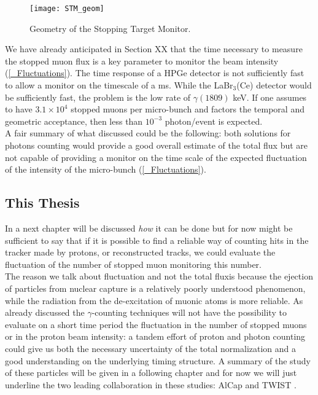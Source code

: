 \documentclass[12pt,a4paper,openright, oneside, titlepage]{book} %
\begin{document}
\begin{figure}[h!]
\centering
\texttt{[image: STM\_geom]}
\caption{Geometry of the Stopping Target Monitor.}
\label{_STM_geom}
\end{figure}

\noindent
We have already anticipated in Section XX that the time necessary to measure the stopped muon flux is a key parameter to monitor
the beam intensity (\ref{_Fluctuations}). 
The time response of a HPGe detector is not sufficiently fast to allow a monitor on the timescale of a ms.
While the LaBr$_3$(Ce) detector would be sufficiently fast, the problem is the low rate of $\gamma(1809)$ keV.
If one assumes to have $3.1\times10^4$ stopped muons per micro-bunch and factors 
the temporal and geometric acceptance, then less than $10^{-3}$ photon/event is expected.\\ 
A fair summary of what discussed could be the following: both solutions for photons counting would provide a good overall estimate of the total flux but are not capable of providing a monitor on the time scale of the expected fluctuation of the intensity of the micro-bunch (\ref{_Fluctuations}).

\subsection{This Thesis}
In a next chapter will be discussed \textit{how} it can be done but for now might be sufficient to say that if it is possible to find a reliable way of counting hits in the tracker made by protons, or reconstructed tracks, we could evaluate the fluctuation of the number of stopped muon monitoring this number.\\
The reason we talk about fluctuation and not the total fluxis because the ejection of particles from nuclear capture is a relatively poorly understood phenomenon, while the radiation from the de-excitation of muonic atoms is more reliable. As already discussed the $\gamma$-counting techniques will not have the possibility to evaluate on a short time period the fluctuation in the number of stopped muons or in the proton beam intensity: a tandem effort of proton and photon counting could give us both the necessary uncertainty of the total normalization and a good understanding on the underlying timing structure.
A summary of the study of these particles will be given in a following chapter and for now we will just underline the two leading collaboration in these studies: AlCap \cite{AlCap:2018} and TWIST \cite{TWIST:2020}.
\end{document}
